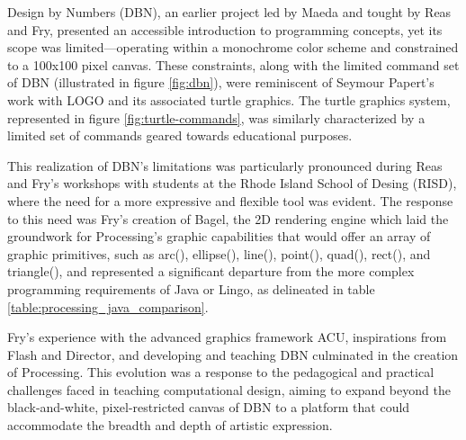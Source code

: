 Design by Numbers (DBN)\parencite{maedaDesignNumbers2001}, an earlier project led by Maeda and tought by Reas and Fry, presented an accessible introduction to programming concepts, yet its scope was limited—operating within a monochrome color scheme and constrained to a 100x100 pixel canvas. These constraints, along with the limited command set of DBN (illustrated in figure \ref{fig:dbn}), were reminiscent of Seymour Papert's work with LOGO and its associated turtle graphics. The turtle graphics system, represented in figure \ref{fig:turtle-commands}, was similarly characterized by a limited set of commands geared towards educational purposes.

This realization of DBN's limitations was particularly pronounced during Reas and Fry's workshops with students at the Rhode Island School of Desing (RISD), where the need for a more expressive and flexible tool was evident\parencite{fryModernPrometheusHistory2018}. The response to this need was Fry's creation of Bagel, the 2D rendering engine which laid the groundwork for Processing's graphic capabilities that would offer an array of graphic primitives, such as arc(), ellipse(), line(), point(), quad(), rect(), and triangle(), and represented a significant departure from the more complex programming requirements of Java or Lingo, as delineated in table \ref{table:processing_java_comparison}.

Fry's experience with the advanced graphics framework ACU, inspirations from Flash and Director, and developing and teaching DBN culminated in the creation of Processing. This evolution was a response to the pedagogical and practical challenges faced in teaching computational design, aiming to expand beyond the black-and-white, pixel-restricted canvas of DBN to a platform that could accommodate the breadth and depth of artistic expression.

